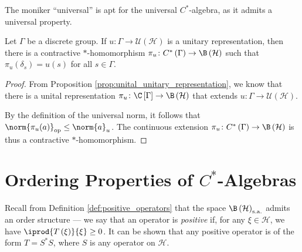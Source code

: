 The moniker ``universal'' is apt for the universal $C^{\ast}$-algebra, as it admits a universal property.
\begin{theorem}
  Let $\Gamma$ be a discrete group. If $u\colon \Gamma\rightarrow \mathcal{U}\left( \mathcal{H} \right)$ is a unitary representation, then there is a contractive $\ast$-homomorphism $\pi_u\colon C^{\ast}\left( \Gamma \right)\rightarrow \B\left( \mathcal{H} \right)$ such that $\pi_u\left( \delta_s \right) = u(s)$ for all $s\in\Gamma$.
  \begin{center}
  \end{center}
\end{theorem}
\begin{proof}
  From Proposition \ref{prop:unital_unitary_representation}, we know that there is a unital representation $\pi_u\colon \C\left[ \Gamma \right]\rightarrow \B\left( \mathcal{H} \right)$ that extends $u\colon \Gamma\rightarrow \mathcal{U}\left( \mathcal{H} \right)$.\newline

  By the definition of the universal norm, it follows that $\norm{\pi_u(a)}_{\op}\leq \norm{a}_{u}$. The continuous extension $\pi_u\colon C^{\ast}\left( \Gamma \right)\rightarrow \B\left( \mathcal{H} \right)$ is thus a contractive $\ast$-homomorphism.
\end{proof}
\section{Ordering Properties of \texorpdfstring{$C^{\ast}$-Algebras}{C*-Algebras}}%
Recall from Definition \ref{def:positive_operators} that the space $\B\left( \mathcal{H} \right)_{\sa}$ admits an order structure --- we say that an operator is \textit{positive} if, for any $\xi\in \mathcal{H}$, we have $ \iprod{T\left( \xi \right)}{\xi} \geq 0 $. It can be shown that any positive operator is of the form $T = S^{\ast}S$, where $S$ is any operator on $\mathcal{H}$.\newline

